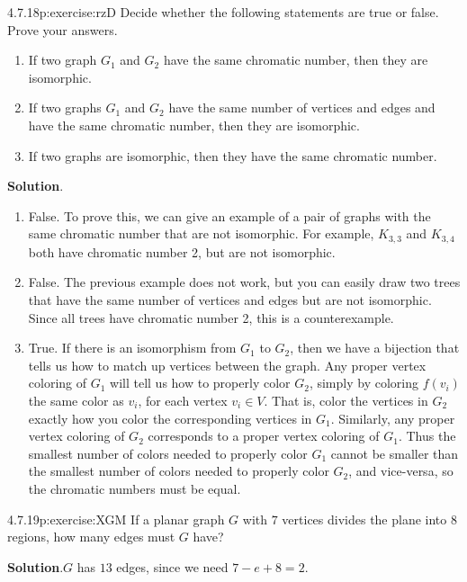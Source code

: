 \documentclass[twoside,11pt,]{book}
\newcommand{\blocktitlefont}{\relax}
\numberwithin{equation}{chapter}
\begin{document}
\begin{divisionsolution}{4.7.18}{}{p:exercise:rzD}%
Decide whether the following statements are true or false. Prove your answers.%
\begin{enumerate}[label=(\alph*)]
\item{}If two graph \(G_1\) and \(G_2\) have the same chromatic number, then they are isomorphic.%
\item{}If two graphs \(G_1\) and \(G_2\) have the same number of vertices and edges and have the same chromatic number, then they are isomorphic.%
\item{}If two graphs are isomorphic, then they have the same chromatic number.%
\end{enumerate}
%
\par\smallskip%
\noindent\textbf{\blocktitlefont Solution}.\quad{}%
\begin{enumerate}[label=(\alph*)]
\item{}False. To prove this, we can give an example of a pair of graphs with the same chromatic number that are not isomorphic. For example, \(K_{3,3}\) and \(K_{3,4}\) both have chromatic number 2, but are not isomorphic.%
\item{}False. The previous example does not work, but you can easily draw two trees that have the same number of vertices and edges but are not isomorphic. Since all trees have chromatic number 2, this is a counterexample.%
\item{}True. If there is an isomorphism from \(G_1\) to \(G_2\), then we have a bijection that tells us how to match up vertices between the graph. Any proper vertex coloring of \(G_1\) will tell us how to properly color \(G_2\), simply by coloring \(f(v_i)\) the same color as \(v_i\), for each vertex \(v_i \in V\). That is, color the vertices in \(G_2\) exactly how you color the corresponding vertices in \(G_1\). Similarly, any proper vertex coloring of \(G_2\) corresponds to a proper vertex coloring of \(G_1\). Thus the smallest number of colors needed to properly color \(G_1\) cannot be smaller than the smallest number of colors needed to properly color \(G_2\), and vice-versa, so the chromatic numbers must be equal.%
\end{enumerate}
%
\end{divisionsolution}%
\begin{divisionsolution}{4.7.19}{}{p:exercise:XGM}%
If a planar graph \(G\) with \(7\) vertices divides the plane into 8 regions, how many edges must \(G\) have?%
\par\smallskip%
\noindent\textbf{\blocktitlefont Solution}.\quad{}\(G\) has \(13\) edges, since we need \(7 - e + 8 = 2\).%
\end{divisionsolution}%
\end{document}
